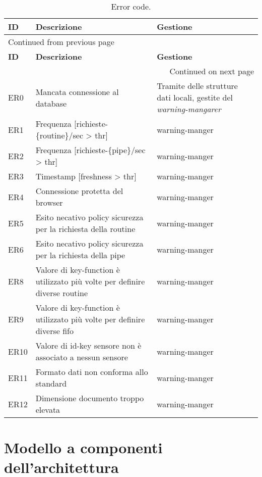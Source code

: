 \documentclass[onecolumn,a4paper]{article}
\begin{document}
\begin{longtable}{|l|p{5.2cm}|p{5.2cm}|}
\caption{Error code.}
\\
\cellcolor{grey!15} \textbf{ID} & \cellcolor{grey!15} \textbf{Descrizione} & \cellcolor{grey!15} \textbf{Gestione}\\
\hline
\endfirsthead
\multicolumn{3}{l}{Continued from previous page} \\
\hline

\cellcolor{grey!15} \textbf{ID} & \cellcolor{grey!15} \textbf{Descrizione} & \cellcolor{grey!15} \textbf{Gestione} \\

\hline
\endhead
\hline\multicolumn{3}{r}{Continued on next page} \\
\endfoot
\endlastfoot
\hline
ER0 & Mancata connessione al database & Tramite delle strutture dati locali, gestite del \emph{warning-mangarer}\\
\hline
ER1 & Frequenza [richieste-\{routine\}/sec > thr] & warning-manger\\
\hline
ER2 & Frequenza [richieste-\{pipe\}/sec > thr] & warning-manger\\
\hline
ER3 & Timestamp [freshness > thr] & warning-manger\\
\hline
ER4 & Connessione protetta del browser & warning-manger\\
\hline
ER5 & Esito necativo policy sicurezza per la richiesta della routine & warning-manger\\
\hline
ER6 & Esito necativo policy sicurezza per la richiesta della pipe & warning-manger\\
\hline
ER8 & Valore di key-function è utilizzato più volte per definire diverse routine & warning-manger\\
\hline
ER9 & Valore di key-function è utilizzato più volte per definire diverse fifo & warning-manger\\
\hline
ER10 & Valore di id-key sensore non è associato a nessun sensore & warning-manger\\
\hline
ER11 & Formato dati non conforma allo standard & warning-manger\\
\hline
ER12 & Dimensione documento troppo elevata & warning-manger\\
\hline
\end{longtable}

\section{Modello a componenti dell’architettura}
\label{sec:orgbe2ed3a}
\end{document}
